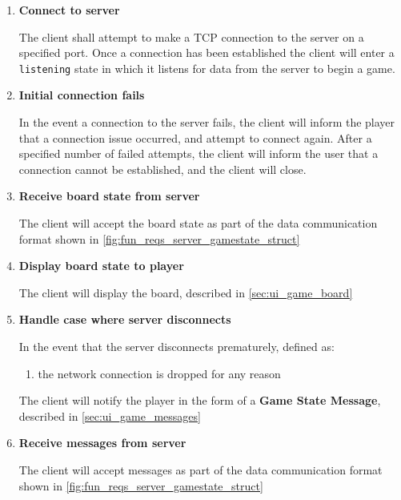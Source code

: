 \documentclass[letterpaper]{article}
\begin{document}
\begin{enumerate}
    \item \textbf{Connect to server}

          The client shall attempt to make a TCP connection to
          the server on a specified port. Once a connection has
          been established the client will enter a
          \texttt{listening} state in which it listens for data
          from the server to begin a game.
          
    \item \textbf{Initial connection fails}

          In the event a connection to the server fails, the
          client will inform the player that a connection issue
          occurred, and attempt to connect again. After a
          specified number of failed attempts, the client will
          inform the user that a connection cannot be
          established, and the client will close.
          
    \item \textbf{Receive board state from server}

          The client will accept the board state as part of the
          data communication format shown in 
          \cref{fig:fun_reqs_server_gamestate_struct}
          
    \item \textbf{Display board state to player}
          
          The client will display the board, described in
          \cref{sec:ui_game_board}
          
    \item \textbf{Handle case where server disconnects}
          
          In the event that the server disconnects prematurely,
          defined as:
          \begin{enumerate}
            \item the network connection is dropped for any
                reason
          \end{enumerate}
          The client will notify the player in the form of
          a \textbf{Game State Message}, described in
          \cref{sec:ui_game_messages}
          
    \item \textbf{Receive messages from server}
          
          The client will accept messages as part of the
          data communication format shown in
          \cref{fig:fun_reqs_server_gamestate_struct}
          

\end{enumerate}
\end{document}
